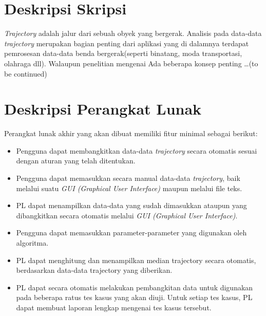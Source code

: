 \documentclass[a4paper,twoside]{article}
\begin{document}
\title{\@judultopik}
\author{\nama \textendash \@npm} 

\newcommand{\nama}{Lionov}
\newcommand{\@npm}{1997730020}
\newcommand{\@judultopik}{Median Trajectory} %
\newcommand{\jumpemb}{1} %
\newcommand{\tanggal}{01/01/1900}
\maketitle


\section{Deskripsi Skripsi}
{\it Trajectory} adalah jalur dari sebuah obyek yang bergerak. Analisis pada data-data {\it trajectory} merupakan bagian penting dari aplikasi yang di dalamnya terdapat pemrosesan data-data benda bergerak(seperti binatang, moda transportasi, olahraga dll).
Walaupun penelitian mengenai Ada beberapa konsep penting \ldots (to be continued)

\section{Deskripsi Perangkat Lunak}
Perangkat lunak akhir yang akan dibuat memiliki fitur minimal sebagai berikut:
\begin{itemize}
	\item Pengguna dapat membangkitkan data-data {\it trajectory} secara otomatis sesuai dengan aturan yang telah ditentukan.
	\item Pengguna dapat memasukkan secara manual data-data {\it trajectory}, baik melalui suatu {\it GUI (Graphical User Interface)} maupun melalui file teks. 
	\item PL dapat menampilkan data-data yang sudah dimasukkan ataupun yang dibangkitkan secara otomatis melalui {\it GUI (Graphical User Interface)}.
	\item Pengguna dapat memasukkan parameter-parameter yang digunakan oleh algoritma.
	\item PL dapat menghitung dan menampilkan median trajectory secara otomatis, berdasarkan data-data trajectory yang diberikan.
	\item PL dapat secara otomatis melakukan pembangkitan data untuk digunakan pada beberapa ratus tes kasus yang akan diuji. Untuk setiap tes kasus, PL dapat membuat laporan lengkap mengenai tes kasus tersebut.
\end{itemize}
\end{document}
